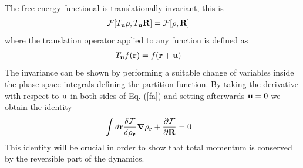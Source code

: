 \documentclass[b5paper,openright,11pt]{book}
\begin{document}
The free energy functional is translationally invariant, this is
\begin{align}
  {\cal F}[T_{\bf u}\rho,T_{\bf u}{\bf R}]&=  {\cal F}[\rho,{\bf R}]
\label{fa}
\end{align}
where the translation operator applied to any function is defined as
\begin{align}
  T_{\bf u}f({\bf r})&=f({\bf r}+{\bf u})
\end{align}
The  invariance  can be  shown  by  performing  a suitable  change  of
variables  inside the  phase space  integrals defining  the partition
function.  By taking the derivative with  respect to ${\bf u}$ in both
sides of Eq.  (\ref{fa}) and  setting afterwards ${\bf u}=0$ we obtain
the identity
\begin{align}
  \int d{\bf r}\frac{\delta {\cal F}}{\delta \rho_{\bf r}}
\boldsymbol{\nabla}\rho_{\bf r}&+\frac{\partial {\cal F}}{\partial {\bf R}}=0
\label{iden1}
\end{align}
This  identity will be  crucial in  order to  show that  total  momentum is
conserved by  the reversible part  of the dynamics.  
\end{document}
